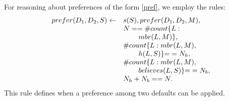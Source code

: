 \documentclass{article}
\newcommand{\memo}[1]{
  \ifthenelse {\boolean{includeMemo}}{\medskip\noindent\fbox{\begin{minipage}[b]{\dimexpr\linewidth-1em}#1\end{minipage}}\medskip\newline} 
}
\begin{document}
 For reasoning about preferences of the form \eqref{pref}, we employ the rules:
% 
{
\begin{equation}\label{lp:pref}
\begin{array}{ll}
prefer(D_1, D_2, S) \leftarrow &  s(S),   prefer(D_1, D_2, M),   \\
     & N  = =\# count \{L : \\
     &  \hspace*{.3in} mbr(L, M)\},  \\ 
     & \# count \{L : mbr(L, M),  \\
     &  \hspace*{.3in}  h(L, S) \} {=} =N_h, \\
     & \# count \{L : mbr(L, M), \\
     & \hspace*{.3in} believes(L, S) \} {=} =N_b, \\
     & N_h+N_b==N.
      \end{array}
\end{equation} 
}
%
This rule defines when a preference among two defaults can be applied. 
%
%
%
% 
%
%
%
%
%
\end{document}
